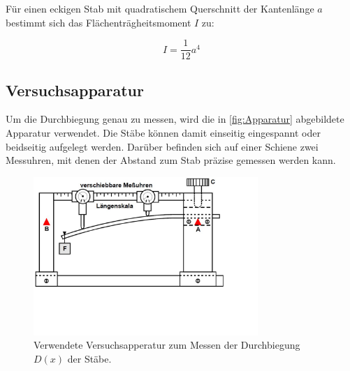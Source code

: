 Für einen eckigen Stab mit quadratischem Querschnitt der Kantenlänge $a$ bestimmt sich das Flächenträgheitsmoment $I$ zu: 

\begin{equation}
    I=\frac{1}{12}a^{4}
    \label{eq:Flächenträgheitsmoment eckig}
\end{equation}

\subsection{Versuchsapparatur}
\label{sec:Apparatur}

Um die Durchbiegung genau zu messen, wird die in \autoref{fig:Apparatur} abgebildete Apparatur verwendet.
Die Stäbe können damit einseitig eingespannt oder beidseitig aufgelegt werden.
Darüber befinden sich auf einer Schiene zwei Messuhren, mit denen der Abstand zum Stab präzise gemessen werden kann.

\begin{figure} [H]
    \centering
    \includegraphics[height=6cm]{content/Abbildungen/Apparatur.pdf}
    \caption{Verwendete Versuchsapperatur zum Messen der Durchbiegung $D(x)$ der Stäbe. \cite{v103}}
    \label{fig:Apparatur}
\end{figure}